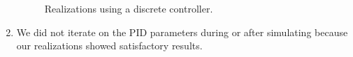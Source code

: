 \documentclass[11pt]{article} %
\begin{document}
\begin{enumerate}
\begin{figure}
\begin{tabular}{cc}
      \\
    \end{tabular}
    \caption{Realizations using a discrete controller.}
  \end{figure}
\item %
  We did not iterate on the \ac{PID} parameters during or after simulating
  because our realizations showed satisfactory results.
\end{enumerate}
\end{document}
